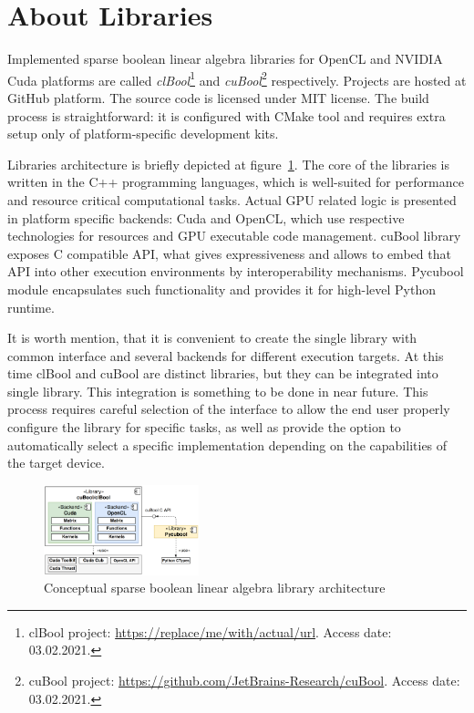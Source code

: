 \section{About Libraries}



Implemented sparse boolean linear algebra libraries for OpenCL and NVIDIA Cuda platforms are called
\textit{clBool}\footnote{clBool project: \url{https://replace/me/with/actual/url}. Access date: 03.02.2021.} and \textit{cuBool}\footnote{cuBool project: \url{https://github.com/JetBrains-Research/cuBool}. Access date: 03.02.2021.} respectively.
Projects are hosted at GitHub platform. The source code is licensed under MIT license.
The build process is straightforward: it is configured with CMake tool and requires extra setup only of platform-specific development kits. 

Libraries architecture is briefly depicted at figure~\ref{fig:generic_architecture}. 
The core of the libraries is written in the C++ programming languages, which is well-suited for performance and resource critical computational tasks. 
Actual GPU related logic is presented in platform specific backends: Cuda and OpenCL, which use respective technologies for resources and GPU executable code management.
cuBool library exposes C compatible API, what gives expressiveness and allows to embed that API into other execution environments by interoperability mechanisms. 
Pycubool module encapsulates such functionality and provides it for high-level Python runtime.

It is worth mention, that it is convenient to create the single library with common interface and several backends for different execution targets.
At this time clBool and cuBool are distinct libraries, but they can be integrated into single library.
This integration is something to be done in near future.
This process requires careful selection of the interface to allow the end user properly configure the library for specific tasks, as well as provide the option to automatically select a specific implementation depending on the capabilities of the target device.

\begin{figure}[t]
    \centering
    \includegraphics[width=0.4\textwidth]{generic_architecture.png}
    \caption{Conceptual sparse boolean linear algebra library architecture}
    \label{fig:generic_architecture}
\end{figure}

